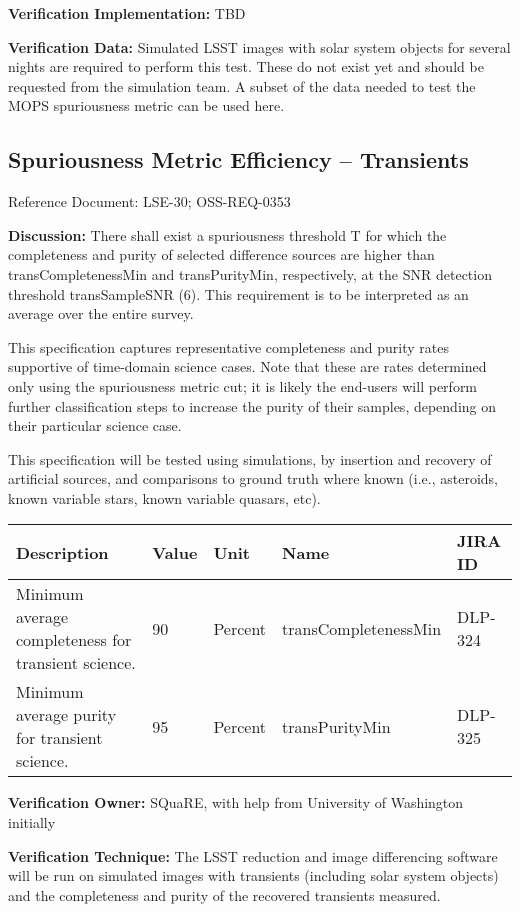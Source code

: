 \textbf{Verification Implementation:} TBD

\textbf{Verification Data:} Simulated LSST images with solar system
objects for several nights are required to perform this test. These do
not exist yet and should be requested from the simulation team. A subset
of the data needed to test the MOPS spuriousness metric can be used
here.

\subsection{Spuriousness Metric Efficiency --
Transients}\label{spuriousness-metric-efficiency-transients}

Reference Document: LSE-30; OSS-REQ-0353

\textbf{Discussion:} There shall exist a spuriousness threshold T for
which the completeness and purity of selected difference sources are
higher than transCompletenessMin and transPurityMin, respectively, at
the SNR detection threshold transSampleSNR (6). This requirement is to
be interpreted as an average over the entire survey.

This specification captures representative completeness and purity rates
supportive of time-domain science cases. Note that these are rates
determined only using the spuriousness metric cut; it is likely the
end-users will perform further classification steps to increase the
purity of their samples, depending on their particular science case.

This specification will be tested using simulations, by insertion and
recovery of artificial sources, and comparisons to ground truth where
known (i.e., asteroids, known variable stars, known variable quasars,
etc).

\begin{longtable}[]{@{}lllll@{}}
\toprule
Description & Value & Unit & Name & JIRA ID\tabularnewline
\midrule
\endhead
Minimum average completeness for transient science. & 90 & Percent &
transCompletenessMin & DLP-324\tabularnewline
Minimum average purity for transient science. & 95 & Percent &
transPurityMin & DLP-325\tabularnewline
\bottomrule
\end{longtable}

\textbf{Verification Owner:} SQuaRE, with help from University of
Washington initially

\textbf{Verification Technique:} The LSST reduction and image
differencing software will be run on simulated images with transients
(including solar system objects) and the completeness and purity of the
recovered transients measured.

